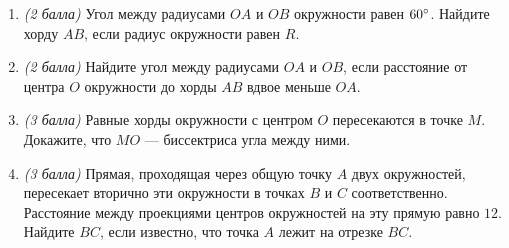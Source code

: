 \documentclass[12pt, a4paper]{article}
\begin{document}
	
	\begin{enumerate}
		\item \textit{(2 балла)} Угол между радиусами $OA$ и $OB$ окружности равен $60\degree$. Найдите хорду $AB$, если радиус окружности равен $R$.
		\item \textit{(2 балла)} Найдите угол между радиусами $OA$ и $OB$, если расстояние от центра $O$ окружности до хорды $AB$ вдвое меньше $OA$.
		\item \textit{(3 балла)} Равные хорды окружности с центром $O$ пересекаются в точке $M$. Докажите, что $MO$ — биссектриса угла между ними.
		\item \textit{(3 балла)} Прямая, проходящая через общую точку $A$ двух окружностей, пересекает вторично эти окружности в точках $B$ и $C$ соответственно. Расстояние между проекциями центров окружностей на эту прямую равно $12$. Найдите $BC$, если известно, что точка $A$ лежит на отрезке $BC$.

	\end{enumerate}
\end{document}

